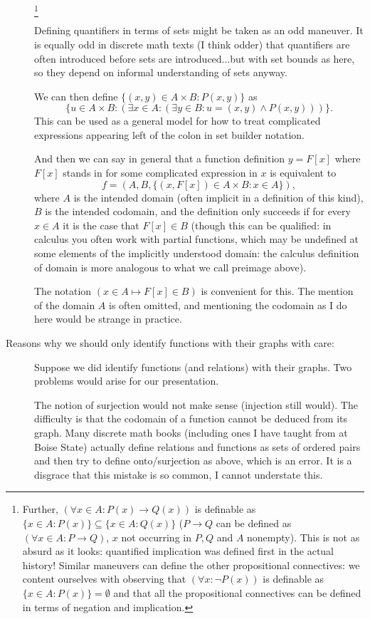 \documentclass[12pt]{article}
\begin{document}
\begin{description}
\footnote{Further, $(\forall x \in A:P(x) \rightarrow Q(x))$ is definable as $\{x \in A:P(x)\} \subseteq \{x \in A:Q(x)\}$
($P \rightarrow Q$ can be defined as $(\forall x \in A:P \rightarrow Q)$, $x$ not occurring in $P,Q$ and $A$ nonempty).  This is not as  absurd as it looks:  quantified implication was defined first in the actual history!  Similar maneuvers can define the other propositional connectives:  we content ourselves with observing that $(\forall x:\neg P(x))$ is definable as $\{x \in A:P(x)\} = \emptyset$ and that all the propositional connectives can be defined in terms of negation and implication.}

Defining quantifiers in terms of sets might be taken as an odd maneuver.  It is equally odd in discrete math texts (I think odder) that quantifiers are often introduced before sets are introduced...but with set bounds as here, so they depend on informal understanding of sets anyway.

We can then define $\{(x,y) \in A \times B:P(x,y)\}$ as $$\{u \in A \times B:(\exists x \in A:(\exists y \in B:u=(x,y) \wedge P(x,y)))\}.$$ This can be used as a general model for how to treat complicated expressions appearing left of the colon in set builder notation.

And then we can say in general that a function definition $y = F[x]$ where $F[x]$ stands in for some complicated expression in $x$ is equivalent to $$f=(A,B,\{(x,F[x]) \in A \times B:x\in A\}),$$  where $A$ is the intended domain (often implicit in a definition of this kind), $B$ is the intended codomain, and the definition only succeeds if for every $x \in A$ it is the case that $F[x] \in B$ (though this can be qualified:  in calculus you often work with partial functions, which may be undefined at some elements of the implicitly understood domain:  the calculus definition of domain is more analogous to what we call preimage above).

The notation $(x \in A \mapsto F[x] \in B)$ is convenient for this.  The mention of the domain $A$ is often omitted, and mentioning the codomain as I do here would be strange in practice.


\item[Reasons why we should only identify functions with their graphs with care:]

Suppose we did identify functions (and relations) with their graphs.  Two problems would arise for our presentation.

The notion of surjection would not make sense (injection still would).  The difficulty is that
the codomain of a function cannot be deduced from its graph.  Many discrete math books (including ones I have taught from at Boise State) actually
define relations and functions as sets of ordered pairs and then try to define onto/surjection as above, which is an error.  It is a disgrace that this mistake is so common, I cannot understate this.


\end{description}
\end{document}
